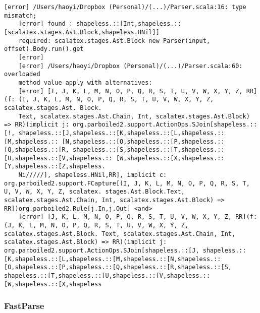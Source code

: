 \begin{lstlisting}[language=terminal, caption={
Fragment (sic!) błędu wygenerowanego przez bibliotekę \textit{parboiled2}, który pochodzi z prezentacji Li Haoyi na temat \textit{FastParse}\cite{fastparse-talk}.
}]
    [error] /Users/haoyi/Dropbox (Personal)/(...)/Parser.scala:16: type mismatch;
    [error] found : shapeless.::[Int,shapeless.::[scalatex.stages.Ast.Block,shapeless.HNil]]
    required: scalatex.stages.Ast.Block new Parser(input, offset).Body.run().get
    [error]
    [error] /Users/haoyi/Dropbox (Personal)/(...)/Parser.scala:60: overloaded
    method value apply with alternatives:
    [error] [I, J, K, L, M, N, O, P, Q, R, S, T, U, V, W, X, Y, Z, RR](f: (I, J, K, L, M, N, O, P, Q, R, S, T, U, V, W, X, Y, Z, scalatex.stages.Ast. Block.
    Text, scalatex.stages.Ast.Chain, Int, scalatex.stages.Ast.Block) => RR)(implicit j: org.parboiled2.support.ActionOps.SJoin[shapeless.::[!, shapeless.::[J,shapeless.::[K,shapeless.::[L,shapeless.::[M,shapeless.:: [N,shapeless.::[O,shapeless.::[P,shapeless.::[Q,shapeless.::[R, shapeless.::[S,shapeless.::[T,shapeless.::[U,shapeless.::[V,shapeless.:: [W,shapeless.::[X,shapeless.::[Y,shapeless.::[Z,shapeless.
    Ni/////], shapeless.HNil,RR], implicit c: org.parboiled2.support.FCapture[(I, J, K, L, M, N, O, P, Q, R, S, T, U, V, W, X, Y, Z, scalatex. stages.Ast.Block.Text, scalatex.stages.Ast.Chain, Int, scalatex.stages.Ast.Block) => RR])org.parboiled2.Rule[j.In,j.Out] <and>
    [error] [J, K, L, M, N, O, P, Q, R, S, T, U, V, W, X, Y, Z, RR](f: (J, K, L, M, N, O, P, Q, R, S, T, U, V, W, X, Y, Z, scalatex.stages.Ast.Block. Text, scalatex.stages.Ast.Chain, Int, scalatex.stages.Ast.Block) => RR)(implicit j: org.parboiled2.support.ActionOps.SJoin[shapeless.::[J, shapeless.::[K,shapeless.::[L,shapeless.::[M,shapeless.::[N,shapeless.:: [O,shapeless.::[P,shapeless.::[Q,shapeless.::[R,shapeless.::[S, shapeless.::[T,shapeless.::[U,shapeless.::[V,shapeless.:: [W,shapeless.::[X,shapeless
\end{lstlisting}

\subsubsection{FastParse}
\label{subsec:fastparse}


